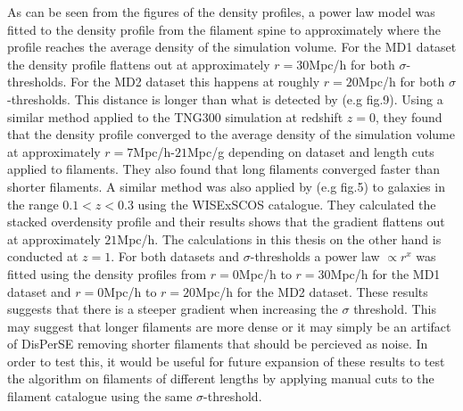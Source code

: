 As can be seen from the figures of the density profiles, a power law model was fitted to the density profile from the filament spine to approximately where the profile reaches the average density of the simulation volume. For the MD1 dataset the density profile flattens out at approximately $r=30$Mpc/h for both $\sigma$-thresholds. For the MD2 dataset this happens at roughly $r=20$Mpc/h for both $\sigma$-thresholds. This distance is longer than what is detected by \cite{Gal_rraga_Espinosa_2020} (e.g fig.9). Using a similar method applied to the TNG300 simulation\cite{nelson2021illustristng} at redshift $z=0$, they found that the density profile converged to the average density of the simulation volume at approximately $r=7$Mpc/h-$21$Mpc/g depending on dataset and length cuts applied to filaments. They also found that long filaments converged faster than shorter filaments. A similar method was also applied by \cite{bonjean} (e.g fig.5) to galaxies in the range $0.1<z<0.3$ using the WISExSCOS catalogue\cite{Bilicki_2016}. They calculated the stacked overdensity profile and their results shows that the gradient flattens out at approximately $21$Mpc/h. The calculations in this thesis on the other hand is conducted at $z=1$. For both datasets and $\sigma$-thresholds a power law $\propto r^x$ was fitted using the density profiles from $r=0$Mpc/h to $r=30$Mpc/h for the MD1 dataset and $r=0$Mpc/h to $r=20$Mpc/h for the MD2 dataset. These results suggests that there is a steeper gradient when increasing the $\sigma$ threshold. This may suggest that longer filaments are more dense or it may simply be an artifact of DisPerSE removing shorter filaments that should be percieved as noise. In order to test this, it would be useful for future expansion of these results to test the algorithm on filaments of different lengths by applying manual cuts to the filament catalogue using the same $\sigma$-threshold.\\\indent
